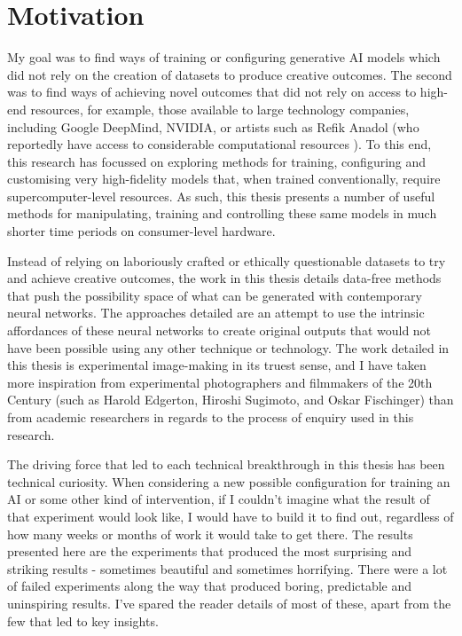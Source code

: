 \section{Motivation}

My goal was to find ways of training or configuring generative AI models which did not rely on the creation of datasets to produce creative outcomes. 
The second was to find ways of achieving novel outcomes that did not rely on access to high-end resources, for example, those available to large technology companies, including Google DeepMind, NVIDIA, or artists such as Refik Anadol (who reportedly have access to considerable computational resources  \citep{caulfield2022refik}). 
To this end, this research has focussed on exploring methods for training, configuring and customising very high-fidelity models that, when trained conventionally, require supercomputer-level resources. 
As such, this thesis presents a number of useful methods for manipulating, training and controlling these same models in much shorter time periods on consumer-level hardware.

Instead of relying on laboriously crafted or ethically questionable datasets to try and achieve creative outcomes, the work in this thesis details data-free methods that push the possibility space of what can be generated with contemporary neural networks.
The approaches detailed are an attempt to use the intrinsic affordances of these neural networks to create original outputs that would not have been possible using any other technique or technology. 
The work detailed in this thesis is experimental image-making in its truest sense, and I have taken more inspiration from experimental photographers and filmmakers of the 20th Century (such as Harold Edgerton, Hiroshi Sugimoto, and Oskar Fischinger) than from academic researchers in regards to the process of enquiry used in this research.

The driving force that led to each technical breakthrough in this thesis has been technical curiosity. 
When considering a new possible configuration for training an AI or some other kind of intervention, if I couldn’t imagine what the result of that experiment would look like, I would have to build it to find out, regardless of how many weeks or months of work it would take to get there. 
The results presented here are the experiments that produced the most surprising and striking results - sometimes beautiful and sometimes horrifying. 
There were a lot of failed experiments along the way that produced boring, predictable and uninspiring results. 
I’ve spared the reader details of most of these, apart from the few that led to key insights.


